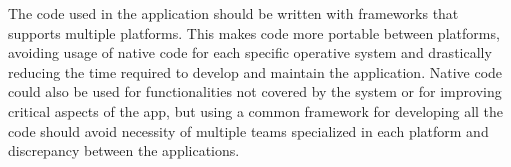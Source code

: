 The code used in the application should be written with frameworks that supports multiple platforms. This makes code more portable between platforms, avoiding usage of native code for each specific operative system and drastically reducing the time required to develop and maintain the application. Native code could also be used for functionalities not covered by the system or for improving critical aspects of the app, but using a common framework for developing all the code should avoid necessity of multiple teams specialized in each platform and discrepancy between the applications.
